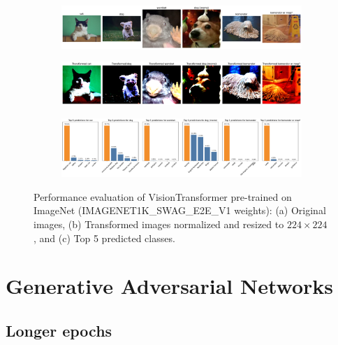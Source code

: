 \begin{figure}[H]
    \centering
    \begin{subfigure}{0.95\textwidth}
        \includegraphics[width=\textwidth]{original_images_vit_bis}
        \caption{}
        \label{subfig:original_images_vit_bis}
    \end{subfigure}
    \begin{subfigure}{0.95\textwidth}
        \includegraphics[width=\textwidth]{transformed_images_vit_bis}
        \caption{}
        \label{subfig:transformed_images_vit_bis}
    \end{subfigure}
    \begin{subfigure}{0.95\textwidth}
        \includegraphics[width=\textwidth]{prediction_plots_vit_bis}
        \caption{}
        \label{subfig:prediction_plots_vit_bis}
    \end{subfigure}
    \caption{Performance evaluation of VisionTransformer pre-trained on ImageNet (IMAGENET1K\_SWAG\_E2E\_V1 weights): (a) Original images, (b) Transformed images normalized and resized to $224 \times 224$, and (c) Top 5 predicted classes.}
    \label{fig:vit_refined}
\end{figure}

\section{Generative Adversarial Networks}
\graphicspath{{figs/2de/}}

\subsection{Longer epochs} \label{appendix:longer_epochs}

